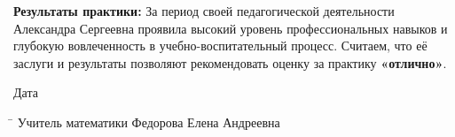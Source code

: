 \documentclass[a4paper,12pt]{article}
\begin{document}
\vspace{5mm}

\textbf{Результаты практики:} За период своей педагогической деятельности Александра Сергеевна проявила высокий уровень профессиональных навыков и глубокую вовлеченность в учебно-воспитательный процесс. Считаем, что её заслуги и результаты позволяют рекомендовать оценку за практику \textbf{«отлично»}.

\vspace{10mm}

\noindent
Дата \underline{\hspace{5cm}}
\begin{tabbing}
\hspace{4cm} \= \kill
Учитель математики \> \underline{\hspace{5cm}} Федорова Елена Андреевна
\end{tabbing}


\vspace{5mm}
\end{document}
